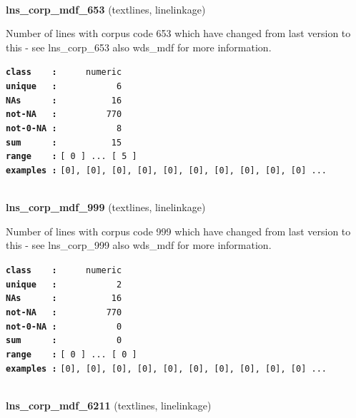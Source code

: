 \documentclass[]{article}
\begin{document}
~

\textbf{lns\_corp\_mdf\_653} (textlines, linelinkage)

Number of lines with corpus code 653 which have changed from last
version to this - see lns\_corp\_653 also wds\_mdf for more information.

\textbf{\texttt{class\ \ \ \ :}} \texttt{~~~~~numeric}\\
\textbf{\texttt{unique\ \ \ :}} \texttt{~~~~~~~~~~~6}\\
\textbf{\texttt{NAs\ \ \ \ \ \ :}} \texttt{~~~~~~~~~~16}\\
\textbf{\texttt{not-NA\ \ \ :}} \texttt{~~~~~~~~~770}\\
\textbf{\texttt{not-0-NA\ :}} \texttt{~~~~~~~~~~~8}\\
\textbf{\texttt{sum\ \ \ \ \ \ :}} \texttt{~~~~~~~~~~15}\\
\textbf{\texttt{range\ \ \ \ :}}
\texttt{{[}\ 0\ {]}\ ...\ {[}\ 5\ {]}}\\
\textbf{\texttt{examples\ :}}
\texttt{{[}0{]},\ {[}0{]},\ {[}0{]},\ {[}0{]},\ {[}0{]},\ {[}0{]},\ {[}0{]},\ {[}0{]},\ {[}0{]},\ {[}0{]}\ ...}\\

~

\textbf{lns\_corp\_mdf\_999} (textlines, linelinkage)

Number of lines with corpus code 999 which have changed from last
version to this - see lns\_corp\_999 also wds\_mdf for more information.

\textbf{\texttt{class\ \ \ \ :}} \texttt{~~~~~numeric}\\
\textbf{\texttt{unique\ \ \ :}} \texttt{~~~~~~~~~~~2}\\
\textbf{\texttt{NAs\ \ \ \ \ \ :}} \texttt{~~~~~~~~~~16}\\
\textbf{\texttt{not-NA\ \ \ :}} \texttt{~~~~~~~~~770}\\
\textbf{\texttt{not-0-NA\ :}} \texttt{~~~~~~~~~~~0}\\
\textbf{\texttt{sum\ \ \ \ \ \ :}} \texttt{~~~~~~~~~~~0}\\
\textbf{\texttt{range\ \ \ \ :}}
\texttt{{[}\ 0\ {]}\ ...\ {[}\ 0\ {]}}\\
\textbf{\texttt{examples\ :}}
\texttt{{[}0{]},\ {[}0{]},\ {[}0{]},\ {[}0{]},\ {[}0{]},\ {[}0{]},\ {[}0{]},\ {[}0{]},\ {[}0{]},\ {[}0{]}\ ...}\\

~

\textbf{lns\_corp\_mdf\_6211} (textlines, linelinkage)
\end{document}
